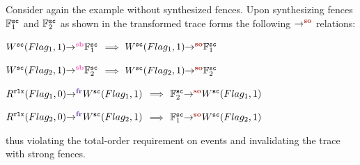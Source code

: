Consider again the example  without synthesized fences.
Upon synthesizing \sc fences $\mathbb{F}^\sc_1$ and 
$\mathbb{F}^\sc_2$ as shown in  the
transformed trace forms the following $\so{}{}{}$ relations:

$\seqb{}{W^\sc(Flag_1,1)}{\mathbb{F}^\sc_1}$ $\implies$ $\so{}{W^\sc(Flag_1,1)}{\mathbb{F}^\sc_1}$

$\seqb{}{W^\sc(Flag_2,1)}{\mathbb{F}^\sc_2}$ $\implies$ $\so{}{W^\sc(Flag_2,1)}{\mathbb{F}^\sc_2}$

$\fr{}{R^\rlx(Flag_1,0)}{W^\sc(Flag_1,1)}$ $\implies$ $\so{}{\mathbb{F}^\sc_2}{W^\sc(Flag_1,1)}$

$\fr{}{R^\rlx(Flag_2,0)}{W^\sc(Flag_2,1)}$ $\implies$ $\so{}{\mathbb{F}^\sc_1}{W^\sc(Flag_2,1)}$

thus violating the total-order requirement on \sc events and
invalidating the trace with strong fences.